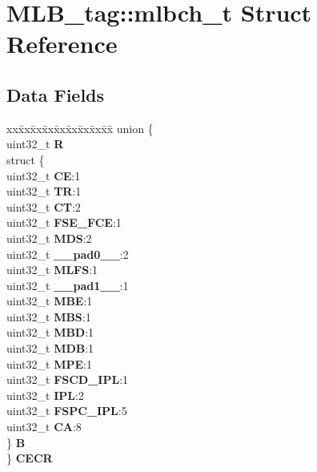 \hypertarget{structMLB__tag_1_1mlbch__t}{}\section{M\+L\+B\+\_\+tag\+::mlbch\+\_\+t Struct Reference}
\label{structMLB__tag_1_1mlbch__t}
\subsection*{Data Fields}
\begin{DoxyCompactItemize}
\item 
\mbox{\label{structMLB__tag_1_1mlbch__t_ab4fd51f4f0034e4195f881c35074ec9b}} 
\begin{tabbing}
xx\=xx\=xx\=xx\=xx\=xx\=xx\=xx\=xx\=\kill
union \{\\
\>uint32\_t {\bfseries R}\\
\>struct \{\\
\>\>uint32\_t {\bfseries CE}:1\\
\>\>uint32\_t {\bfseries TR}:1\\
\>\>uint32\_t {\bfseries CT}:2\\
\>\>uint32\_t {\bfseries FSE\_FCE}:1\\
\>\>uint32\_t {\bfseries MDS}:2\\
\>\>uint32\_t {\bfseries \_\_pad0\_\_}:2\\
\>\>uint32\_t {\bfseries MLFS}:1\\
\>\>uint32\_t {\bfseries \_\_pad1\_\_}:1\\
\>\>uint32\_t {\bfseries MBE}:1\\
\>\>uint32\_t {\bfseries MBS}:1\\
\>\>uint32\_t {\bfseries MBD}:1\\
\>\>uint32\_t {\bfseries MDB}:1\\
\>\>uint32\_t {\bfseries MPE}:1\\
\>\>uint32\_t {\bfseries FSCD\_IPL}:1\\
\>\>uint32\_t {\bfseries IPL}:2\\
\>\>uint32\_t {\bfseries FSPC\_IPL}:5\\
\>\>uint32\_t {\bfseries CA}:8\\
\>\} {\bfseries B}\\
\} {\bfseries CECR}\\


\end{tabbing}
\end{DoxyCompactItemize}
